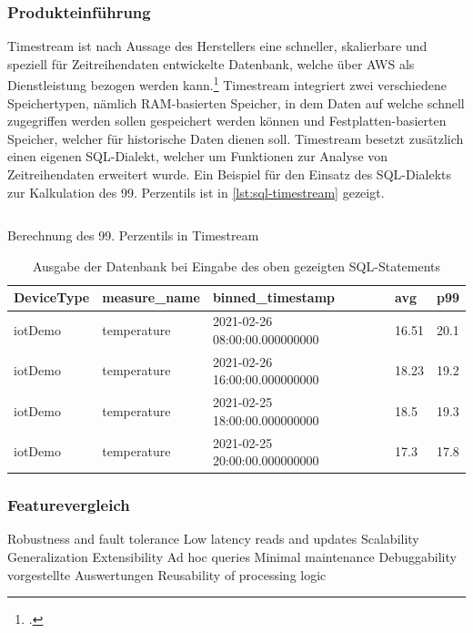 \subsubsection{Produkteinführung}
Timestream ist nach Aussage des Herstellers eine schneller, skalierbare und speziell für Zeitreihendaten entwickelte Datenbank, welche über \ac{AWS} als Dienstleistung bezogen werden kann.\footcite[Vgl. auch im Folgenden][]{AmazonWebServicesInc..o.J.h} Timestream integriert zwei verschiedene Speichertypen, nämlich \ac{RAM}-basierten Speicher, in dem Daten auf welche schnell zugegriffen werden sollen gespeichert werden können und Festplatten-basierten Speicher, welcher für historische Daten dienen soll.
Timestream besetzt zusätzlich einen eigenen \ac{SQL}-Dialekt, welcher um Funktionen zur Analyse von Zeitreihendaten erweitert wurde. Ein Beispiel für den Einsatz des \ac{SQL}-Dialekts zur Kalkulation des 99. Perzentils ist in \autoref{lst:sql-timestream} gezeigt.

\begin{listing}[H]
\inputminted[frame=lines,breaklines=true]{sql}{code/timestream-example.sql}
\caption{Berechnung des 99. Perzentils in Timestream}
\label{lst:sql-timestream}
\end{listing}

\begin{table}[H]
\centering
\begin{tabular}{|l|l|l|l|l|}
\hline
DeviceType & measure\_name & binned\_timestamp & avg & p99 \\ \hline
iotDemo & temperature & 2021-02-26 08:00:00.000000000 & 16.51 & 20.1 \\ \hline
iotDemo & temperature & 2021-02-26 16:00:00.000000000 & 18.23 & 19.2 \\ \hline
iotDemo & temperature & 2021-02-25 18:00:00.000000000 & 18.5 & 19.3 \\ \hline
iotDemo & temperature & 2021-02-25 20:00:00.000000000 & 17.3 & 17.8 \\ \hline
\end{tabular}
\caption{Ausgabe der Datenbank bei Eingabe des oben gezeigten SQL-Statements}
\label{tab:AusgabeSQL}
\end{table}
\subsubsection{Featurevergleich} 
Robustness and fault tolerance
Low latency reads and updates
Scalability
Generalization
Extensibility
Ad hoc queries
Minimal maintenance
Debuggability
vorgestellte Auswertungen 
Reusability of processing logic

